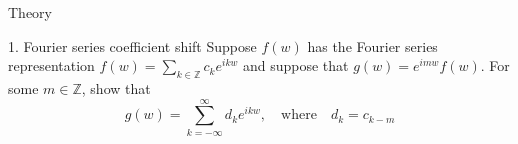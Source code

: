 \begin{section}{Theory}

\begin{homeworkSection}{1. Fourier series coefficient shift}
Suppose $f(w)$ has the Fourier series representation $f(w) = \sum_{k \in \mathbb{Z}} c_k e^{ikw}$ and suppose that $g(w) = e^{imw}f(w)$. For some $m \in \mathbb{Z}$, show that
$$
	g(w) = \sum_{k = -\infty}^{\infty} d_k e^{ikw}, \quad \text{where} \quad d_k = c_{k-m}
$$
\\
\end{homeworkSection}


\end{section}

